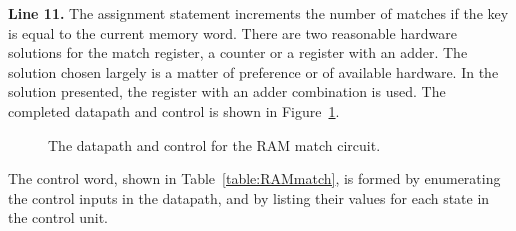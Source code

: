 \textbf{ Line 11.}  The assignment statement increments the number of 
matches if the key is equal to the current memory word.  There
are two reasonable hardware solutions for the match register,
a counter or a register with an adder.  The solution chosen
largely is a matter of preference or of available hardware.
In the solution presented, the register with an adder 
combination is used.  The completed datapath and control is shown in 
Figure~\ref{fig:datapathControlRAMmatch}.

\begin{figure}[ht]
\caption{The datapath and control for the RAM match circuit.}
\label{fig:datapathControlRAMmatch}
\end{figure}

The control word, shown in Table~\ref{table:RAMmatch},
is formed by enumerating the control inputs in the datapath, and by 
listing their values for each state in the control unit.  


